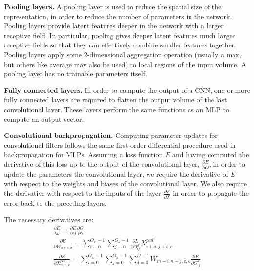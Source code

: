 \noindent \textbf{Pooling layers.} A pooling layer is used to reduce the spatial size of the representation, in order to reduce the number of parameters in the network. Pooling layers provide latent features deeper in the network with a larger receptive field. In particular, pooling gives deeper latent features much larger receptive fields so that they can effectively combine smaller features together. Pooling layers apply some 2-dimensional aggregation operation (usually a max, but others like average may also be used) to local regions of the input volume. A pooling layer has no trainable parameters itself. \par

\noindent \textbf{Fully connected layers.} In order to compute the output of a CNN, one or more fully connected layers are required to flatten the output volume of the last convolutional layer. These layers perform the same functions as an MLP to compute an output vector. \par

\noindent \textbf{Convolutional backpropagation.} Computing parameter updates for convolutional filters follows the same first order differential procedure used in backpropagation for MLPs. Assuming a loss function $ E $ and having computed the derivative of this loss up to the output of the convolutional layer, $ \frac{\partial E} {\partial O} $, in order to update the parameters the convolutional layer, we require the derivative of $ E $ with respect to the weights and biases of the convolutional layer. We also require the derivative with respect to the inputs of the layer $\frac{\partial E} {\partial X}$ in order to propagate the error back to the preceding layers. \par

\noindent The necessary derivatives are:
\unskip
\begin{subequations}
	\begin{gather}
		\frac{\partial E} {\partial b} = \frac{\partial E} {\partial O}\frac{\partial O} {\partial b} \\
		\frac{\partial E} {\partial W_{a,b,c,d}} = \sum_{i=0}^{O_w - 1}\sum_{j=0}^{O_h - 1}\frac{\partial L} {\partial O_{ij}^{d}}X_{i+a,j+b,c}^{pad} \\
		\frac{\partial E} {\partial X_{m,n,c}^{pad}} = \sum_{i=0}^{O_w - 1}\sum_{j=0}^{O_h - 1}\sum_{d=0}^{D - 1}W_{m-i,n-j,c,d}\frac{\partial E} {\partial O_{ij}^{d}}
	\end{gather}
\end{subequations}

